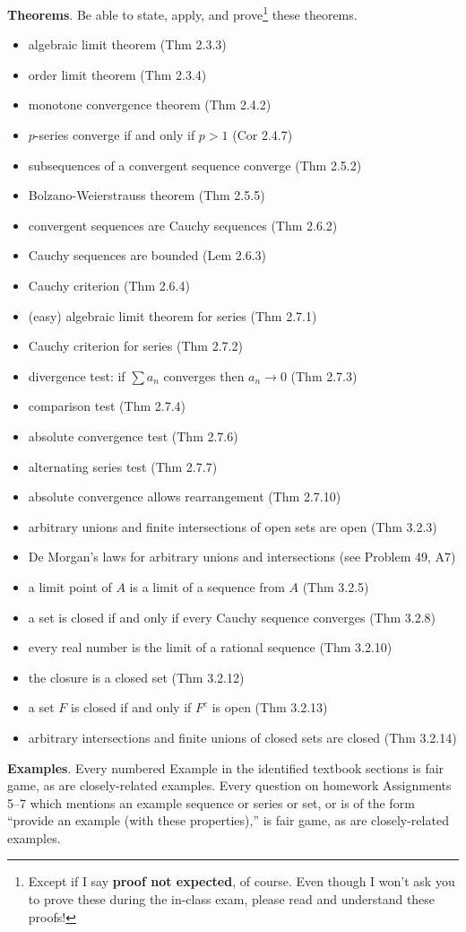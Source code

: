 \documentclass[12pt]{amsart}
\begin{document}
\bigskip
\noindent \textbf{Theorems}.  Be able to state, apply, and prove\footnote{Except if I say \textbf{proof not expected}, of course.  Even though I won't ask you to prove these during the in-class exam, please read and understand these proofs!} these theorems.
\begin{itemize}
\item algebraic limit theorem (Thm 2.3.3) \pne
\item order limit theorem (Thm 2.3.4) \pne
\item monotone convergence theorem (Thm 2.4.2)
\item $p$-series converge if and only if $p>1$ (Cor 2.4.7)
\item subsequences of a convergent sequence converge (Thm 2.5.2)
\item Bolzano-Weierstrauss theorem (Thm 2.5.5) \pne
\item convergent sequences are Cauchy sequences (Thm 2.6.2)
\item Cauchy sequences are bounded (Lem 2.6.3)
\item Cauchy criterion (Thm 2.6.4)
\item (easy) algebraic limit theorem for series (Thm 2.7.1)
\item Cauchy criterion for series (Thm 2.7.2)
\item divergence test: if $\sum a_n$ converges then $a_n\to 0$ (Thm 2.7.3)
\item comparison test (Thm 2.7.4)
\item absolute convergence test (Thm 2.7.6)
\item alternating series test (Thm 2.7.7) \pne
\item absolute convergence allows rearrangement (Thm 2.7.10)
\item arbitrary unions and finite intersections of open sets are open (Thm 3.2.3)
\item De Morgan's laws for arbitrary unions and intersections (see Problem 49, A7)
\item a limit point of $A$ is a limit of a sequence from $A$ (Thm 3.2.5)
\item a set is closed if and only if every Cauchy sequence converges (Thm 3.2.8)
\item every real number is the limit of a rational sequence (Thm 3.2.10)
\item the closure is a closed set (Thm 3.2.12)
\item a set $F$ is closed if and only if $F^c$ is open (Thm 3.2.13)
\item arbitrary intersections and finite unions of closed sets are closed (Thm 3.2.14)
\end{itemize}


\bigskip
\noindent \textbf{Examples}.  Every numbered Example in the identified textbook sections is fair game, as are closely-related examples.  Every question on homework Assignments 5--7 which mentions an example sequence or series or set, or is of the form ``provide an example (with these properties),'' is fair game, as are closely-related examples.

\vfill
\end{document}
